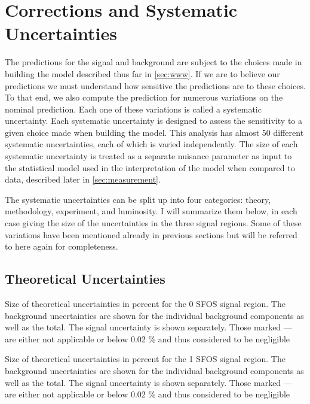 \section{Corrections and Systematic Uncertainties}
\label{sec:systematics}

The predictions for the signal and background are subject
to the choices made in building the model described thus
far in \sec\ref{sec:www}. If we are to believe our predictions
we must understand how sensitive the predictions are to these choices.
To that end, we also compute the prediction for numerous variations
on the nominal prediction. 
Each one of these variations is called a systematic uncertainty. 
Each systematic uncertainty is designed to assess the sensitivity
to a given choice made when building the model. 
This analysis has almost 50 different systematic
uncertainties, each of which is varied independently. The size of 
each systematic uncertainty
is treated as a separate nuisance parameter
as input to the statistical model used in the interpretation of the model
when compared to data, described later in \sec\ref{sec:measurement}.

The systematic uncertainties can be split up into four categories:
theory, methodology, experiment, and luminosity. 
I will summarize them below, in each case giving the 
size of the uncertainties in the three signal regions. 
Some of these variations have 
been mentioned already in previous sections but will be
referred to here again for completeness.

\subsection{Theoretical Uncertainties}




\begin{table}[ht]
\centering

\caption{Size of theoretical uncertainties in percent for the 0 SFOS signal region. The background uncertainties are shown for the individual background components as well as the total. The signal uncertainty is shown separately. Those marked --- are either not applicable or below 0.02 \% and thus considered to be negligible}
\label{tab:sys_theory_0sfos}
\end{table}

\begin{table}[ht]
\centering

\caption{Size of theoretical uncertainties in percent for the 1 SFOS signal region. The background uncertainties are shown for the individual background components as well as the total. The signal uncertainty is shown separately. Those marked --- are either not applicable or below 0.02 \% and thus considered to be negligible}
\label{tab:sys_theory_1sfos}
\end{table}

